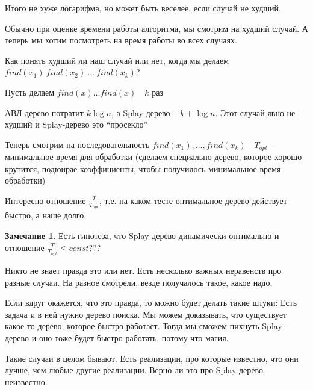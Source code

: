 \documentclass{book}
\theoremstyle{definition}
\newtheorem*{note}{Замечание}
\begin{document}
Итого не хуже логарифма, но может быть веселее, если случай не худший.

Обычно при оценке времени работы алгоритма, мы смотрим на худший случай. А теперь мы хотим посмотреть на время работы во всех случаях.

Как понять худший ли наш случай или нет, когда мы делаем $find(x_1)\ find(x_2)\ \ldots \ find(x_{k} )$?

Пусть делаем $find(x) \ldots find(x)\quad k$ раз

АВЛ-дерево потратит $k\log n$, а Splay-дерево -- $k + \log n$. Этот случай явно не худший и Splay-дерево это ``просекло''

Теперь смотрим на последовательность $find(x_1), \ldots, find(x_k)\quad T_{opt}$ -- минимальное время для обработки (сделаем специально дерево, которое хорошо крутится, подюирае коэффициенты, чтобы получилось минимальное время обработки)

Интересно отношение $\frac{T}{T_{opt}}$, т.е. на каком тесте оптимальное дерево действует быстро, а наше долго.

\begin{note}
    Есть гипотеза, что Splay-дерево динамически оптимально и отношение $\frac{T}{T_{opt}} \leqslant const???$ 

    Никто не знает правда это или нет. Есть несколько важных неравенств про разные случаи. На разное смотрели, везде получалось такое, какое надо.

    Если вдруг окажется, что это правда, то можно будет делать такие штуки:
    Есть задача и в ней нужно дерево поиска. Мы можем доказывать, что существует какое-то дерево, которое быстро работает. Тогда мы сможем пихнуть Splay-дерево и оно тоже будет быстро работать, потому что магия.

    Такие случаи в целом бывают. Есть реализации, про которые известно, что они лучше, чем любые другие реализации. Верно ли это про Splay-дерево -- неизвестно.
\end{note}
\end{document}
